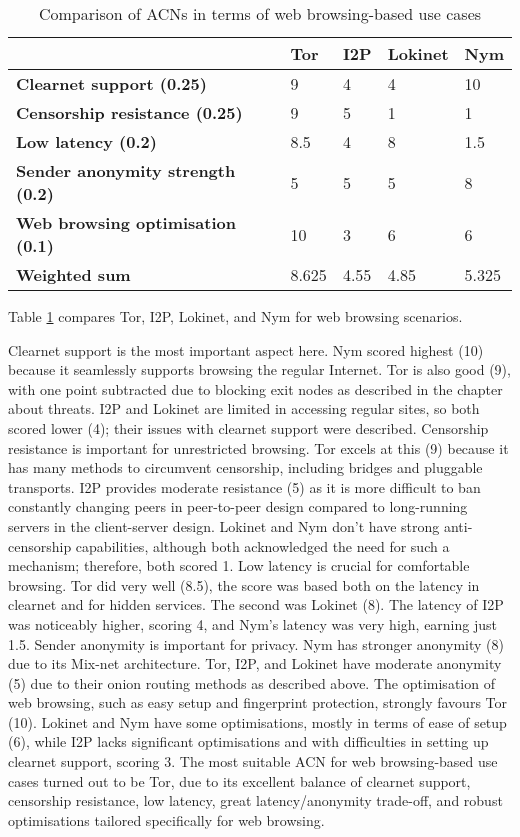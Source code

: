 \begin{table}[!ht]
\caption{Comparison of ACNs in terms of web browsing-based use cases}
\label{tab:web_browsing_uc}
\small
\begin{tabular}{|p{}|p{}|p{}|p{}|p{}|}
\hline
\textbf{} & \textbf{Tor} & \textbf{I2P} & \textbf{Lokinet} & \textbf{Nym} \\
\hline
\textbf{Clearnet support (0.25)} & 9 & 4 & 4 & 10 \\
\hline
\textbf{Censorship resistance (0.25)} & 9 & 5 & 1 & 1 \\
\hline
\textbf{Low latency (0.2)} & 8.5 & 4 & 8 & 1.5 \\
\hline
\textbf{Sender anonymity strength (0.2)} & 5 & 5 & 5 & 8 \\
\hline
\textbf{Web browsing optimisation (0.1)} & 10 & 3 & 6 & 6 \\
\hline
\textbf{Weighted sum} & 8.625 & 4.55 & 4.85 & 5.325 \\
\hline
\end{tabular}
\end{table}

Table \ref{tab:web_browsing_uc} compares Tor, I2P, Lokinet, and Nym for web browsing scenarios.

Clearnet support is the most important aspect here. Nym scored highest (10) because it seamlessly supports browsing the regular Internet. Tor is also good (9), with one point subtracted due to blocking exit nodes as described in the chapter about threats. I2P and Lokinet are limited in accessing regular sites, so both scored lower (4); their issues with clearnet support were described.
Censorship resistance is important for unrestricted browsing. Tor excels at this (9) because it has many methods to circumvent censorship, including bridges and pluggable transports. I2P provides moderate resistance (5) as it is more difficult to ban constantly changing peers in peer-to-peer design compared to long-running servers in the client-server design. Lokinet and Nym don't have strong anti-censorship capabilities, although both acknowledged the need for such a mechanism; therefore, both scored 1.
Low latency is crucial for comfortable browsing. Tor did very well (8.5), the score was based both on the latency in clearnet and for hidden services. The second was Lokinet (8). The latency of I2P was noticeably higher, scoring 4, and Nym’s latency was very high, earning just 1.5.
Sender anonymity is important for privacy. Nym has stronger anonymity (8) due to its Mix-net architecture. Tor, I2P, and Lokinet have moderate anonymity (5) due to their onion routing methods as described above.
The optimisation of web browsing, such as easy setup and fingerprint protection, strongly favours Tor (10). Lokinet and Nym have some optimisations, mostly in terms of ease of setup (6), while I2P lacks significant optimisations and with difficulties in setting up clearnet support, scoring 3.
The most suitable ACN for web browsing-based use cases turned out to be Tor, due to its excellent balance of clearnet support, censorship resistance, low latency, great latency/anonymity trade-off, and robust optimisations tailored specifically for web browsing. 

